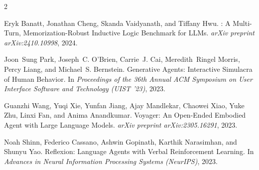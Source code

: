 \documentclass[11pt]{article}
\begin{document}

\begin{thebibliography}{2}

Eryk Banatt, Jonathan Cheng, Skanda Vaidyanath, and Tiffany Hwu.
: A Multi-Turn, Memorization-Robust Inductive Logic Benchmark for {LLMs}.
\newblock \emph{arXiv preprint arXiv:2410.10998}, 2024.

Joon~Sung Park, Joseph~C. O'Brien, Carrie~J. Cai, Meredith~Ringel Morris, Percy Liang, and Michael~S. Bernstein.
\newblock Generative Agents: Interactive Simulacra of Human Behavior.
\newblock In \emph{Proceedings of the 36th Annual ACM Symposium on User Interface Software and Technology (UIST '23)}, 2023.

Guanzhi Wang, Yuqi Xie, Yunfan Jiang, Ajay Mandlekar, Chaowei Xiao, Yuke Zhu, Linxi Fan, and Anima Anandkumar.
\newblock Voyager: An Open-Ended Embodied Agent with Large Language Models.
\newblock \emph{arXiv preprint arXiv:2305.16291}, 2023.

Noah Shinn, Federico Cassano, Ashwin Gopinath, Karthik Narasimhan, and Shunyu Yao.
\newblock Reflexion: Language Agents with Verbal Reinforcement Learning.
\newblock In \emph{Advances in Neural Information Processing Systems (NeurIPS)}, 2023.

\end{thebibliography}
\end{document}
